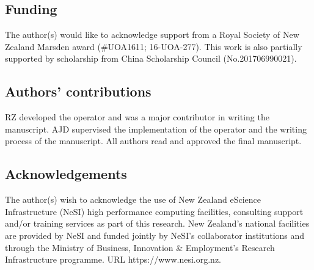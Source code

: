 \documentclass{bmcart}
\begin{document}
\begin{backmatter}
\subsection*{Funding}
The author(s) would like to acknowledge support from a Royal Society of New Zealand Marsden award (\#UOA1611; 16-UOA-277). This work is also partially supported by scholarship from China Scholarship Council (No.201706990021). 

\subsection*{Authors' contributions}
RZ developed the operator and was a major contributor in writing the manuscript. AJD supervised the implementation of the operator and the writing process of the manuscript. All authors read and approved the final manuscript.

\subsection*{Acknowledgements}
The author(s) wish to acknowledge the use of New Zealand eScience Infrastructure (NeSI) high performance computing facilities, consulting support and/or training services as part of this research. New Zealand's national facilities are provided by NeSI and funded jointly by NeSI's collaborator institutions and through the Ministry of Business, Innovation \& Employment's Research Infrastructure programme. URL https://www.nesi.org.nz.



\end{backmatter}
\end{document}
